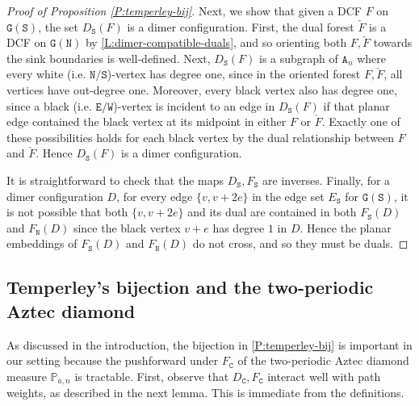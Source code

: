 \documentclass[11pt,twoside]{amsart}
\theoremstyle{plain}
\numberwithin{quest}{section}
\theoremstyle{remark}
\numberwithin{rem}{section}
\theoremstyle{definition}
\renewcommand{\tt}[1]{{\mathtt{#1}}}
\begin{document}
\begin{proof}[Proof of Proposition \ref{P:temperley-bij}]
		Next, we show that given a DCF $F$ on $\tt{G}(\tt{S})$, the set $D_{\tt{S}}(F)$ is a dimer configuration. First, the dual forest $\check F$ is a DCF on $\tt{G}(\tt{N})$ by \cref{L:dimer-compatible-duals}, and so orienting both $F, \check F$ towards the sink boundaries is well-defined. Next, $D_\tt{S}(F)$ is a subgraph of $\tt{A}_n$ where every white (i.e. $\tt{N}/\tt{S}$)-vertex has degree one, since in the oriented forest $F, \check F$, all vertices have out-degree one. Moreover, every black vertex also has degree one, since a black (i.e. $\tt{E}/\tt{W}$)-vertex is incident to an edge in $D_\tt{S}(F)$ if that planar edge contained the black vertex at its midpoint in either $F$ or $\check F$. Exactly one of these possibilities holds for each black vertex by the dual relationship between $F$ and $\check F$. Hence $D_\tt{S}(F)$ is a dimer configuration.
		
		It is straightforward to check that the maps $D_\tt{S}, F_\tt{S}$ are inverses. Finally, for a dimer configuration $D$, for every edge $\{v, v + 2e\}$ in the edge set $E_\tt{S}$ for $\tt{G}(\tt{S})$, it is not possible that both $\{v, v + 2e\}$ and its dual are contained in both $F_\tt{S}(D)$ and $F_\tt{N}(D)$ since the black vertex $v + e$ has degree $1$ in $D$. Hence the planar embeddings of $F_\tt{S}(D)$ and $F_\tt{N}(D)$ do not cross, and so they must be duals.
	\end{proof}
	

	
	\subsection{Temperley's bijection and the two-periodic Aztec diamond} As discussed in the introduction, the bijection in \cref{P:temperley-bij} is important in our setting because the pushforward under $F_\tt{C}$ of the two-periodic Aztec diamond measure $\mathbb P_{a, n}$ is tractable. First, observe that $D_\tt{C}, F_\tt{C}$ interact well with path weights, as described in the next lemma. This is immediate from the definitions.
	
\end{document}
